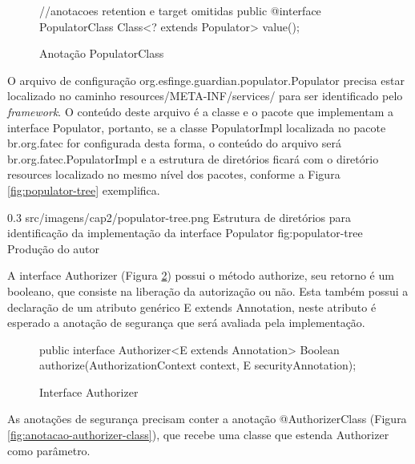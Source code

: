 \begin{figure}[H]
    \centering
    \caption{Anotação PopulatorClass}
    \begin{java}
//anotacoes retention e target omitidas
public @interface PopulatorClass {
	Class<? extends Populator> value();
}
    \end{java}
    \label{fig:populator-class}
\end{figure}

\par O arquivo de configuração org.esfinge.guardian.populator.Populator precisa estar localizado no caminho resources/META-INF/services/ para ser identificado pelo \textit{framework}. O conteúdo deste arquivo é a classe e o pacote que implementam a interface Populator, portanto, se a classe PopulatorImpl localizada no pacote br.org.fatec for configurada desta forma, o conteúdo do arquivo será br.org.fatec.PopulatorImpl e a estrutura de diretórios ficará com o diretório resources localizado no mesmo nível dos pacotes, conforme a Figura \ref{fig:populator-tree} exemplifica.

\begin{image}
{0.3} %
{src/imagens/cap2/populator-tree.png} %
{Estrutura de diretórios para identificação da implementação da interface Populator} %
{fig:populator-tree} %
{Produção do autor} %
\end{image}

\par A interface Authorizer (Figura \ref{fig:interface-authorizer}) possui o método authorize, seu retorno é um booleano, que consiste na liberação da autorização ou não. Esta também possui a declaração de um atributo genérico E extends Annotation, neste atributo é esperado a anotação de segurança que será avaliada pela implementação. 

\begin{figure}[H]
    \centering
    \caption{Interface Authorizer}
    \begin{java}
public interface Authorizer<E extends Annotation> {
	Boolean authorize(AuthorizationContext context, E securityAnnotation);
}
    \end{java}
    \label{fig:interface-authorizer}
\end{figure}

\par As anotações de segurança precisam conter a anotação @AuthorizerClass (Figura \ref{fig:anotacao-authorizer-class}), que recebe uma classe que estenda Authorizer como parâmetro.

